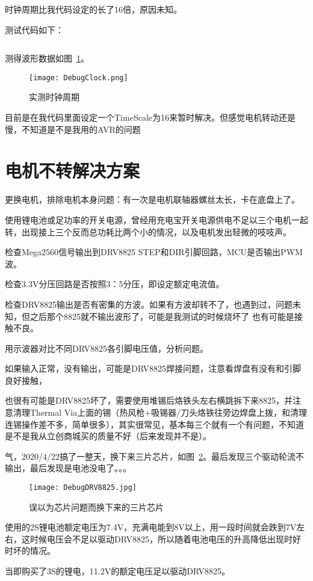 时钟周期比我代码设定的长了16倍，原因未知。

测试代码如下：

\inputminted[mathescape, linenos, breaklines]{c}{Code/PWM-Test/PWM-Test.ino}

测得波形数据如图~\ref{fig:DebugClock}。

\begin{figure}[htbp]
    \centering
    \texttt{[image: DebugClock.png]}
    \caption{实测时钟周期}
    \label{fig:DebugClock}
\end{figure}

目前是在我代码里面设定一个TimeScale为16来暂时解决。但感觉电机转动还是慢，不知道是不是我用的AVR的问题

\section{电机不转解决方案}

更换电机，排除电机本身问题：有一次是电机联轴器螺丝太长，卡在底盘上了。

使用锂电池或足功率的开关电源，曾经用充电宝开关电源供电不足以三个电机一起转，出现接上三个反而总功耗比两个小的情况，以及电机发出轻微的吱吱声。

检查Mega2560信号输出到DRV8825 STEP和DIR引脚回路，MCU是否输出PWM波。

检查3.3V分压回路是否按照3：5分压，即设定额定电流值。

检查DRV8825输出是否有密集的方波。如果有方波却转不了，也遇到过，问题未知，但之后那个8825就不输出波形了，可能是我测试的时候烧坏了
也有可能是接触不良。

用示波器对比不同DRV8825各引脚电压值，分析问题。

如果输入正常，没有输出，可能是DRV8825焊接问题，注意看焊盘有没有和引脚良好接触，

也很有可能是DRV8825坏了，需要使用堆锡后烙铁头左右横跳拆下来8825，并注意清理Thermal Via上面的锡（热风枪+吸锡器/刀头烙铁往旁边焊盘上拨，和清理连锡操作差不多，简单很多），其实很常见，基本每三个就有一个有问题，不知道是不是我从立创商城买的质量不好（后来发现并不是）。

气，2020/4/22搞了一整天，换下来三片芯片，如图~\ref{fig:DebugDRV8825}。最后发现三个驱动轮流不输出，最后发现是电池没电了。。。

\begin{figure}[htbp]
    \centering
    \texttt{[image: DebugDRV8825.jpg]}
    \caption{误以为芯片问题而换下来的三片芯片}
    \label{fig:DebugDRV8825}
\end{figure}

使用的2S锂电池额定电压为7.4V，充满电能到8V以上，用一段时间就会跌到7V左右，这时候电压会不足以驱动DRV8825，所以随着电池电压的升高降低出现时好时坏的情况。

当即购买了3S的锂电，11.2V的额定电压足以驱动DRV8825。